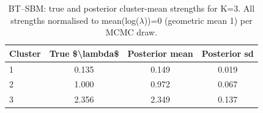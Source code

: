 \begin{table}[!h]
\centering
\caption{BT--SBM: true and posterior cluster-mean strengths for K=3. All strengths normalised to mean(log($\lambda$))=0 (geometric mean 1) per MCMC draw.}
\centering
\begin{tabular}[t]{lccc}
\toprule
Cluster & True \$\textbackslash{}lambda\$ & Posterior mean & Posterior sd\\
\midrule
1 & 0.135 & 0.149 & 0.019\\
2 & 1.000 & 0.972 & 0.067\\
3 & 2.356 & 2.349 & 0.137\\
\bottomrule
\end{tabular}
\end{table}